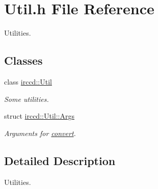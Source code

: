 \hypertarget{a00151}{\section{Util.\-h File Reference}
\label{a00151}
}


Utilities.  


\subsection*{Classes}
\begin{DoxyCompactItemize}
\item 
class \hyperlink{a00069}{irccd\-::\-Util}
\begin{DoxyCompactList}\small\item\em Some utilities. \end{DoxyCompactList}\item 
struct \hyperlink{a00002}{irccd\-::\-Util\-::\-Args}
\begin{DoxyCompactList}\small\item\em Arguments for \hyperlink{a00069_a9214eb255c16d84fd26752530e2b5e94}{convert}. \end{DoxyCompactList}\end{DoxyCompactItemize}


\subsection{Detailed Description}
Utilities. 